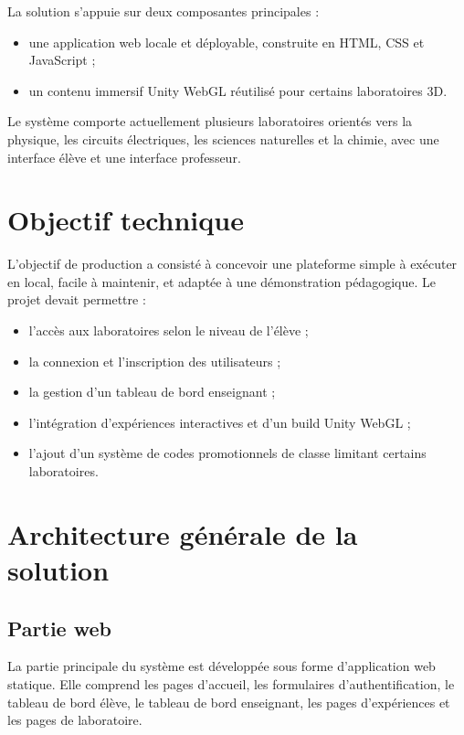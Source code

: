\documentclass[12pt,a4paper]{report}
\begin{document}
La solution s'appuie sur deux composantes principales :

\begin{itemize}[leftmargin=1.2cm]
  \item une application web locale et déployable, construite en HTML, CSS et JavaScript ;
  \item un contenu immersif Unity WebGL réutilisé pour certains laboratoires 3D.
\end{itemize}

Le système comporte actuellement plusieurs laboratoires orientés vers la physique, les
circuits électriques, les sciences naturelles et la chimie, avec une interface élève et
une interface professeur.

\section{Objectif technique}

L'objectif de production a consisté à concevoir une plateforme simple à exécuter en local,
facile à maintenir, et adaptée à une démonstration pédagogique. Le projet devait permettre :

\begin{itemize}[leftmargin=1.2cm]
  \item l'accès aux laboratoires selon le niveau de l'élève ;
  \item la connexion et l'inscription des utilisateurs ;
  \item la gestion d'un tableau de bord enseignant ;
  \item l'intégration d'expériences interactives et d'un build Unity WebGL ;
  \item l'ajout d'un système de codes promotionnels de classe limitant certains laboratoires.
\end{itemize}

\section{Architecture générale de la solution}

\subsection{Partie web}

La partie principale du système est développée sous forme d'application web statique. Elle
comprend les pages d'accueil, les formulaires d'authentification, le tableau de bord élève,
le tableau de bord enseignant, les pages d'expériences et les pages de laboratoire.
\end{document}
